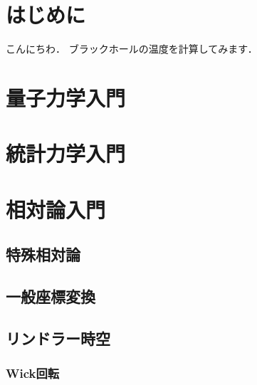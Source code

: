 \documentclass[uplatex,dvipdfmx]{vkaishi}
\begin{document}

\vcmaketitle %



\section*{はじめに}
こんにちわ．
ブラックホールの温度を計算してみます．

\section{量子力学入門}



\section{統計力学入門}


\section{相対論入門}

\subsection{特殊相対論}

\subsection{一般座標変換}

\subsection{リンドラー時空}
\subsubsection{Wick回転}
\end{document}
